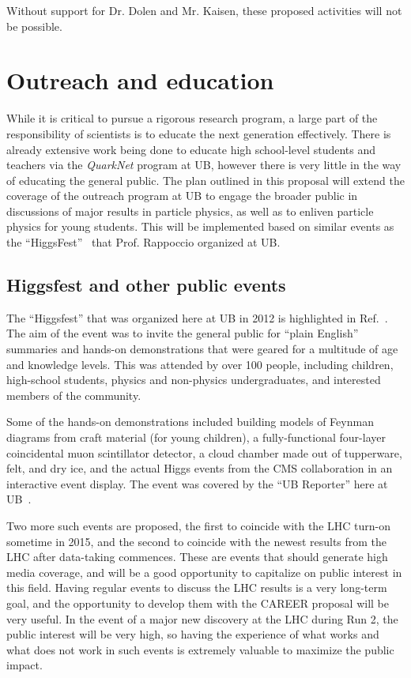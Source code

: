 \documentclass[12pt]{proposalnsf}
\begin{document}
Without support for Dr. Dolen and Mr. Kaisen, these proposed
activities will not be possible. 

\clearpage


\section{Outreach and education}
\label{sec:outreach}


While it is critical to pursue a rigorous research program, a large
part of the responsibility of scientists is to educate the next
generation effectively. There is already extensive work being done to
educate high school-level students and teachers via the {\em QuarkNet}
program  at UB, however there is
very little in the way of educating the general
public. 
The plan outlined in this proposal will extend the coverage of the
outreach program at UB to engage the broader
public in discussions of major results in particle
physics, as well as to enliven particle physics for young students. 
This will be implemented based on similar events as the
``HiggsFest''~\cite{higgsfest} that Prof. Rappoccio organized at UB. 


\subsection{Higgsfest and other public events}

The ``Higgsfest'' that was organized here at UB in 2012
is highlighted in Ref.~\cite{higgsfest}. The aim of the event was to
invite the general public for ``plain English'' summaries and hands-on
demonstrations that were geared for a multitude of age and knowledge
levels. 
This was attended by over 100 people, including children,
high-school students, physics and non-physics undergraduates, and
interested members of the community. 

Some of the hands-on demonstrations included building models of
Feynman diagrams from craft material (for young children), a
fully-functional four-layer coincidental muon scintillator detector,
a cloud chamber made out of tupperware, felt, and dry ice, and the
actual Higgs events from the CMS collaboration in an interactive event
display. 
The event was covered by the ``UB Reporter'' here at
UB~\cite{higgsfest_ubreporter}. 

Two more such events are proposed, the first to coincide with the LHC
turn-on sometime in 2015, and the second to coincide with the newest
results from the LHC after data-taking commences. These are 
events that should generate high media coverage, and will be a good
opportunity to capitalize on public interest in this field. Having
regular events to discuss the LHC results is a very long-term goal,
and the opportunity to develop them with the CAREER proposal
will be very useful. In the event of a major new discovery at the LHC
during Run 2, the public interest will be very high, so having the
experience of what works and what does not work in such events is
extremely valuable to maximize the public impact. 
\end{document}
